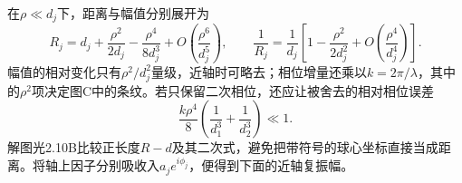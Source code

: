 \documentclass[UTF8,fontset=fandol,a4paper,11pt]{ctexart}
\begin{document}
在$\rho\ll d_j$下，距离与幅值分别展开为
\[
R_j=d_j+\frac{\rho^2}{2d_j}-\frac{\rho^4}{8d_j^3}
+O\!\left(\frac{\rho^6}{d_j^5}\right),\qquad
\frac1{R_j}=\frac1{d_j}
\left[1-\frac{\rho^2}{2d_j^2}
+O\!\left(\frac{\rho^4}{d_j^4}\right)\right].
\]
幅值的相对变化只有$\rho^2/d_j^2$量级，近轴时可略去；相位增量还乘以$k=2\pi/\lambda$，其中的$\rho^2$项决定图C中的条纹。若只保留二次相位，还应让被舍去的相对相位误差
\[
\frac{k\rho^4}{8}\left(\frac1{d_1^3}+\frac1{d_2^3}\right)\ll1.
\]
解图光2.10B比较正长度$R-d$及其二次式，避免把带符号的球心坐标直接当成距离。将轴上因子分别吸收入$a_je^{i\phi_j}$，便得到下面的近轴复振幅。
\begin{center}\begin{minipage}{.98\linewidth}\centering
{}
\end{minipage}
\end{center}
\end{document}
